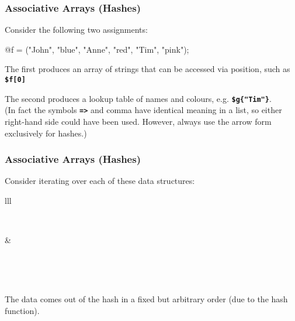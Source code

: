 \begin{frame}
\frametitle{Associative Arrays (Hashes)}
Consider the following two assignments:
\begin{perl}
@f = ("John", "blue", "Anne", "red", "Tim", "pink");
\end{perl}


The first produces an array of strings that can be accessed via position,
such as \textbf{\tt{\$f[0]}}

The second produces a lookup table of names and colours, e.g. \textbf{\tt{\$g\{"Tim"\}}}.
\\(In fact the symbols \textbf{\tt{=>}} and comma have identical meaning in a list,
so either right-hand side could have been used.
However, always use the arrow form exclusively for hashes.)
\end{frame}

\begin{frame}
\frametitle{Associative Arrays (Hashes)}
Consider iterating over each of these data structures:

\begin{center}

\begin{center}
\begin{tabular}{lll}

\begin{minipage}{4cm}

 ~\end{minipage}
 & \begin{minipage}{19cm}

~\end{minipage}
\\[1ex]
\end{tabular}
\end{center}
\end{center}
The data comes out of the hash in a fixed but arbitrary order
(due to the hash function).
\end{frame}

